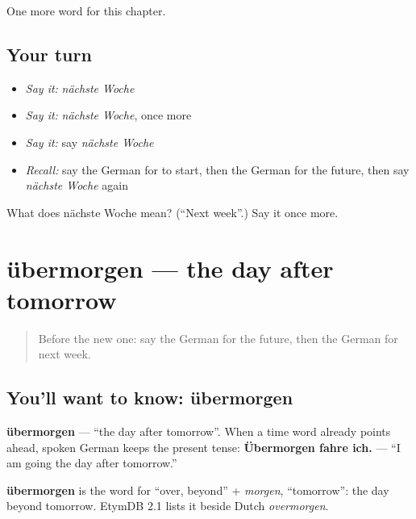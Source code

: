 \begin{grammarlens}[title={What you've built}]
One more word for this chapter.
\end{grammarlens}

\subsection*{Your turn}
\begin{itemize}
\raggedright
  \item \emph{Say it:} \emph{nächste Woche}
  \item \emph{Say it:} \emph{nächste Woche}, once more
  \item \emph{Say it:} say \emph{nächste Woche}
  \item \emph{Recall:} say the German for to start, then the German for the future, then say \emph{nächste Woche} again
\end{itemize}

\begin{tcolorbox}[breakable,colback=teal!4,colframe=teal!35!black,title={Before you move on}]
What does nächste Woche mean? (\textquotedblleft{}Next week\textquotedblright{}.) Say it once more.
\end{tcolorbox}
\section[übermorgen]{übermorgen — the day after tomorrow}

\label{lesson:GE-C142-uebermorgen}



\begin{quote}
Before the new one: say the German for the future, then the German for next week.
\end{quote}

\subsection*{You'll want to know: übermorgen}
\textbf{übermorgen} — \textquotedblleft{}the day after tomorrow\textquotedblright{}. When a time word already points ahead, spoken German keeps the present tense: \textbf{Übermorgen fahre ich.} — \textquotedblleft{}I am going the day after tomorrow.\textquotedblright{}

\begin{cousinweb}
\textbf{übermorgen} is the word for \textquotedblleft{}over, beyond\textquotedblright{} + \emph{morgen}, \textquotedblleft{}tomorrow\textquotedblright{}: the day beyond tomorrow. EtymDB 2.1 lists it beside Dutch \emph{overmorgen}.
\end{cousinweb}

